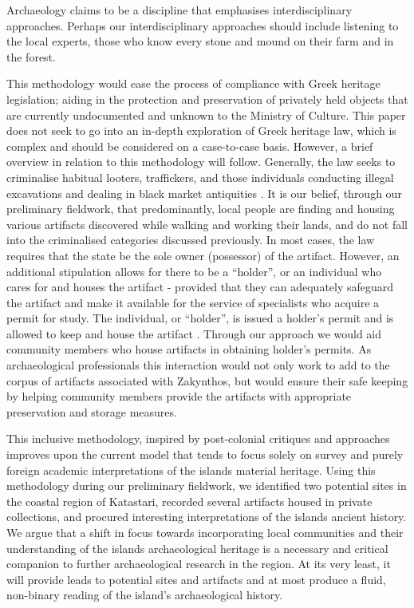 \begin{aquote}{\cite[227]{Holm_1999}}
Archaeology claims to be a discipline that emphasises interdisciplinary approaches. Perhaps our interdisciplinary approaches should include listening to the local experts, those who know every stone and mound on their farm and in the forest.
\end{aquote}
This methodology would ease the process of compliance with Greek heritage legislation; aiding in the protection and preservation of privately held objects that are currently undocumented and unknown to the Ministry of Culture. This paper does not seek to go into an in-depth exploration of Greek heritage law, which is complex and should be considered on a case-to-case basis. However, a brief overview in relation to this methodology will follow. Generally, the law seeks to criminalise habitual looters, traffickers, and those individuals conducting illegal excavations and dealing in black market antiquities \parencite{Kaliampetsos_2008}. 
It is our belief, through our preliminary fieldwork, that predominantly, local people are finding and housing various artifacts discovered while walking and working their lands, and do not fall into the criminalised categories discussed previously. In most cases, the law requires that the state be the sole owner (possessor) of the artifact. However, an additional stipulation allows for there to be a “holder”, or an individual who cares for and houses the artifact - provided that they can adequately safeguard the artifact and make it available for the service of specialists who acquire a permit for study. The individual, or “holder”, is issued a holder’s permit and is allowed to keep and house the artifact \parencite{Kaliampetsos_2008}. Through our approach we would aid community members who house artifacts in obtaining holder’s permits. As archaeological professionals this interaction would not only work to add to the corpus of artifacts associated with Zakynthos, but would ensure their safe keeping by helping community members provide the artifacts with appropriate preservation and storage measures. 
	
	This inclusive methodology, inspired by post-colonial critiques and approaches improves upon the current model that tends to focus solely on survey and purely foreign academic interpretations of the islands material heritage. Using this methodology during our preliminary fieldwork, we identified two potential sites in the coastal region of Katastari, recorded several artifacts housed in private collections, and procured interesting interpretations of the islands ancient history. We argue that a shift in focus towards incorporating local communities and their understanding of the islands archaeological heritage is a necessary and critical companion to further archaeological research in the region. At its very least, it will provide leads to potential sites and artifacts and at most produce a fluid, non-binary reading of the island’s archaeological history. 
	
